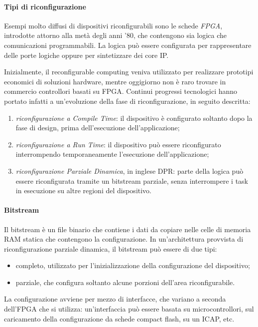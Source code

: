 \paragraph{Tipi di riconfigurazione}
Esempi molto diffusi di dispositivi riconfigurabili sono le schede \emph{\ac{FPGA}},
introdotte attorno alla metà degli anni '80, che contengono sia logica che comunicazioni
programmabili. La logica può essere configurata per rappresentare delle porte logiche
oppure per sintetizzare dei core \ac{IP}.

Inizialmente, il reconfigurable computing veniva utilizzato per realizzare prototipi
economici di soluzioni hardware, mentre oggigiorno non \`e raro trovare in commercio
controllori basati su FPGA. Continui progressi tecnologici hanno portato infatti
a un'evoluzione della fase di riconfigurazione, in seguito descritta:
\begin{enumerate}
 \item \emph{riconfigurazione a Compile Time}: il dispositivo è configurato soltanto
dopo la fase di design, prima dell'esecuzione dell'applicazione;
 \item \emph{riconfigurazione a Run Time}: il dispositivo può essere riconfigurato
interrompendo temporaneamente l'esecuzione dell'applicazione;
 \item \emph{riconfigurazione Parziale Dinamica}, in inglese \ac{DPR}: parte della logica
può essere riconfigurata tramite un bitstream parziale, senza interrompere i task in
esecuzione su altre regioni del dispositivo.
\end{enumerate}

\paragraph{Bitstream}
Il bitstream è un file binario che contiene i dati da copiare nelle celle di memoria RAM
statica che contengono la configurazione. In un'architettura provvista di
riconfigurazione parziale dinamica, il bitstream può essere di due tipi:
\begin{itemize}
 \item completo, utilizzato per l'inizializzazione della configurazione del dispositivo;
 \item parziale, che configura soltanto alcune porzioni dell'area riconfigurabile.
\end{itemize}

La configurazione avviene per mezzo di interfacce, che variano a seconda dell'\ac{FPGA}
che si utilizza: un'interfaccia può essere basata su microcontrollori, sul caricamento
della configurazione da schede compact flash, su un \ac{ICAP}, etc.

